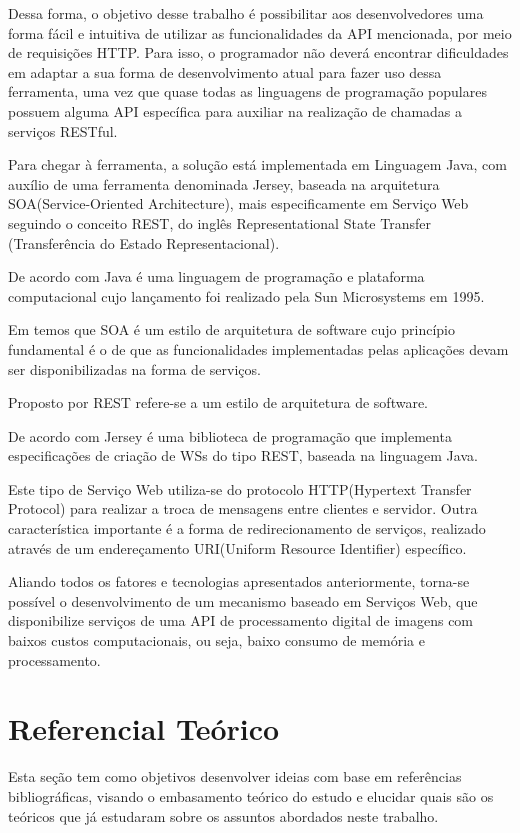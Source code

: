 \documentclass[12pt]{article}
\begin{document}
Dessa forma, o objetivo desse trabalho é possibilitar aos desenvolvedores uma forma fácil e intuitiva de utilizar as funcionalidades da API mencionada, por meio de requisições HTTP. Para isso, o programador não deverá encontrar dificuldades em adaptar a sua forma de desenvolvimento atual para fazer uso dessa ferramenta, uma vez que quase todas as linguagens de programação populares possuem alguma API específica para auxiliar na realização de chamadas a serviços RESTful. 

Para chegar à ferramenta, a solução está implementada em Linguagem
Java, com auxílio de uma ferramenta denominada Jersey, baseada na arquitetura
SOA(Service-Oriented Architecture), mais especificamente em Serviço Web seguindo o conceito REST, do inglês
Representational State Transfer (Transferência do Estado Representacional). 

De acordo com \cite{oracle} Java é uma linguagem de programação e plataforma computacional cujo lançamento foi realizado pela Sun Microsystems em 1995.

Em \cite{soa1,soa2} temos que SOA é um estilo de arquitetura de software cujo princípio fundamental é o de que as funcionalidades implementadas pelas aplicações devam ser disponibilizadas na forma de serviços.

Proposto por \cite{rest} REST refere-se a um estilo de arquitetura de software.

De acordo com \cite{jersey} Jersey é uma biblioteca de programação que implementa especificações de criação de WSs do tipo REST, baseada na linguagem Java.

Este tipo de Serviço Web utiliza-se do protocolo HTTP(Hypertext Transfer Protocol) para realizar a troca
de mensagens entre clientes e servidor. Outra característica importante é a forma de
redirecionamento de serviços, realizado através de um endereçamento URI(Uniform Resource Identifier)
específico.

Aliando todos os fatores e tecnologias apresentados anteriormente, torna-se
possível o desenvolvimento de um mecanismo baseado em Serviços Web, que disponibilize serviços de uma API de processamento digital de imagens
com baixos custos computacionais, ou seja, baixo consumo de memória e processamento.

\section{Referencial Teórico} \label{sec:firstpage}

Esta seção tem como objetivos desenvolver ideias com base em referências bibliográficas, visando o embasamento teórico do estudo e elucidar quais são os teóricos que já estudaram sobre os assuntos abordados neste trabalho.
\end{document}
